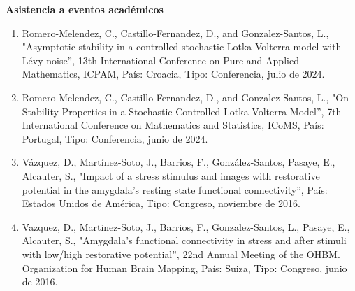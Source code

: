 \textbf{Asistencia a eventos académicos}

\begin{enumerate}

\item  Romero-Melendez, C., Castillo-Fernandez, D., and Gonzalez-Santos, L., "Asymptotic stability in a controlled stochastic 
Lotka-Volterra 
model with Lévy noise”, 13th International Conference on Pure and Applied Mathematics, ICPAM, País: Croacia, Tipo: Conferencia, julio de 
2024.

\item  Romero-Melendez, C., Castillo-Fernandez, D., and Gonzalez-Santos, L., "On Stability Properties in a Stochastic Controlled 
Lotka-Volterra 
Model”, 7th International Conference on Mathematics and Statistics, ICoMS, País: Portugal, Tipo: Conferencia, junio de 2024.

\item  Vázquez, D., Martínez-Soto, J., Barrios, F., González-Santos, Pasaye, E., Alcauter, S., "Impact of a stress stimulus and images with 
restorative potential in the amygdala’s resting state functional connectivity”, País: Estados Unidos de América, Tipo: Congreso, noviembre de 
2016.

\item Vazquez, D., Martinez-Soto, J., Barrios, F., Gonzalez-Santos, L., Pasaye, E., Alcauter, S., "Amygdala's functional connectivity in 
stress 
and after stimuli with low/high restorative potential”, 22nd Annual Meeting of the OHBM. Organization for Human Brain Mapping, País: Suiza, 
Tipo: Congreso, junio de 2016.
\end{enumerate}

